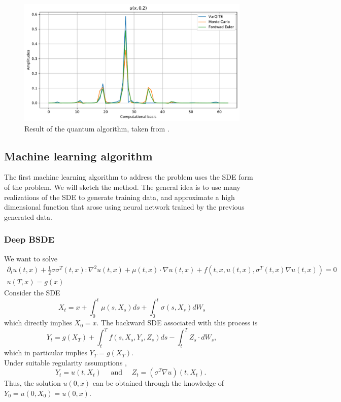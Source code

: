 \documentclass[11pt]{article}
\theoremstyle{definition}
\begin{document}
\begin{figure}
\centering
\includegraphics[width=1.0\textwidth]{qresult.pdf}
\caption{\label{fig:frog}Result of the quantum algorithm, taken from \cite{alghassi_variational_2022}.}
\end{figure}



\subsection{Machine learning algorithm}
The first machine learning algorithm\cite{han_solving_2018} to address the problem uses the SDE form of the problem. We will sketch the method. The general idea is to use many realizations of the SDE to generate training data, and approximate a high dimensional function that arose using neural network trained by the previous generated data.
\subsubsection{Deep BSDE}
We want to solve $$
\begin{array}{r}
\partial_t u(t, x)+\frac{1}{2} \sigma \sigma^T(t, x): \nabla^2 u(t, x)+\mu(t, x) \cdot \nabla u(t, x)+f\left(t, x, u(t, x), \sigma^T(t, x) \nabla u(t, x)\right)=0 \\
u(T, x)=g(x)
\end{array}
$$
Consider the SDE
$$
X_t=x+\int_0^t \mu\left(s, X_s\right) d s+\int_0^t \sigma\left(s, X_s\right) d W_s
$$
which directly implies $X_0=x$. The backward SDE associated with this process is
$$
Y_t=g\left(X_T\right)+\int_t^T f\left(s, X_s, Y_s, Z_s\right) d s-\int_t^T Z_s \cdot d W_s,
$$
which in particular implies $Y_T=g\left(X_T\right)$.\\
Under suitable regularity assumptions ,
$$
Y_t=u\left(t, X_t\right) \quad \text { and } \quad Z_t=\left(\sigma^T \nabla u\right)\left(t, X_t\right) \text {. }
$$
Thus, the solution $u(0, x)$ can be obtained through the knowledge of $Y_0=u\left(0, X_0\right)=u(0, x)$.\\
\end{document}
